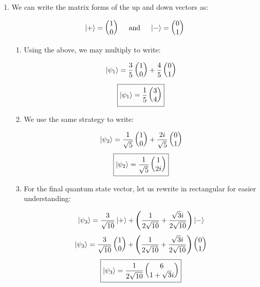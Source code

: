 \begin{enumerate}
\begin{enumerate}
      \item We can write the matrix forms of the up and down vectors as:

        $$\ket{+}=\left( \begin{matrix} 1\\ 0\end{matrix} \right)\quad\text{ and }\quad\ket{-}=\left( \begin{matrix} 0\\ 1\end{matrix} \right)$$

        \begin{enumerate}

          \item Using the above, we may multiply to write:

            $$\ket{\psi_1}=\frac{3}{5}\left( \begin{matrix}1\\0\end{matrix} \right)+\frac{4}{5}\left( \begin{matrix} 0\\1\end{matrix} \right)$$
            $$\boxed{\ket{\psi_1}=\frac{1}{5}\left( \begin{matrix}3\\4\end{matrix} \right)}$$

          \item We use the same strategy to write:

            $$\ket{\psi_2}=\frac{1}{\sqrt{5}}\left( \begin{matrix}1\\0\end{matrix} \right)+\frac{2i}{\sqrt{5}}\left( \begin{matrix} 0\\1\end{matrix} \right)$$
            $$\boxed{\ket{\psi_2}=\frac{1}{\sqrt{5}}\left( \begin{matrix} 1\\2i\end{matrix} \right)}$$

          \item For the final quantum state vector, let us rewrite in rectangular for easier understanding:

            $$\ket{\psi_3}=\frac{3}{\sqrt{10}}\ket{+}+\left( \frac{1}{2\sqrt{10}}+\frac{\sqrt{3}i}{2\sqrt{10}} \right)\ket{-}$$
            $$\ket{\psi_3}=\frac{3}{\sqrt{10}}\left( \begin{matrix}1\\0\end{matrix} \right)+\left( \frac{1}{2\sqrt{10}}+\frac{\sqrt{3}i}{2\sqrt{10}} \right)\left( \begin{matrix} 0\\1\end{matrix} \right)$$
            $$\boxed{\ket{\psi_3}=\frac{1}{2\sqrt{10}}\left( \begin{matrix} 6\\1+\sqrt{3}i\end{matrix} \right)}$$


\end{enumerate}
\end{enumerate}
\end{enumerate}
